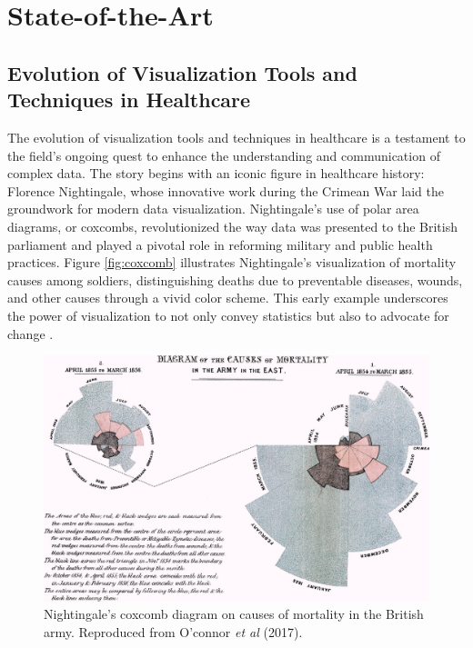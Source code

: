 \section{State-of-the-Art}\label{state-of-the-art}

\subsection{Evolution of Visualization Tools and Techniques in Healthcare}\label{evolution-of-visualization-tools-and-techniques-in-healthcare}

The evolution of visualization tools and techniques in healthcare is a testament to the field's ongoing quest to enhance the understanding and communication of complex data. The story begins with an iconic figure in healthcare history: Florence Nightingale, whose innovative work during the Crimean War laid the groundwork for modern data visualization. Nightingale's use of polar area diagrams, or coxcombs, revolutionized the way data was presented to the British parliament and played a pivotal role in reforming military and public health practices. Figure \ref{fig:coxcomb} illustrates Nightingale's visualization of mortality causes among soldiers, distinguishing deaths due to preventable diseases, wounds, and other causes through a vivid color scheme. This early example underscores the power of visualization to not only convey statistics but also to advocate for change \cite{soa7}.

\begin{figure}[ht]
  \centering
  \includegraphics[width=\textwidth]{media/fig20.jpeg}
  \caption{Nightingale's coxcomb diagram on causes of mortality in the British army. Reproduced from O'connor \textit{et al} (2017)\cite{soa7}.}
  \label{fig:vsc}
\end{figure}


